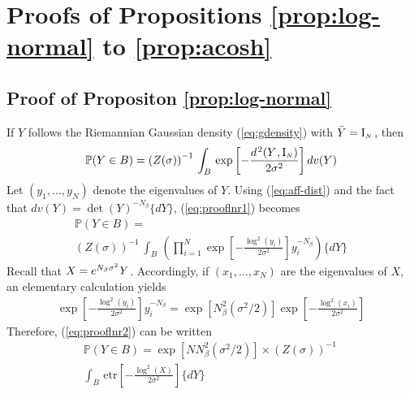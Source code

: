 \documentclass[draftclsnofoot]{IEEEtran}
\begin{document}
\appendices

\section{Proofs of Propositions \ref{prop:log-normal} to \ref{prop:acosh}} \label{app:proofs}

\subsection{Proof of Propositon \ref{prop:log-normal}}
\noindent 

If $Y$ follows the Riemannian Gaussian density (\ref{eq:gdensity}) with $\bar{Y} = \mathrm{I}_{\scriptscriptstyle N}\hspace{0.03cm}$, then 
\begin{equation} \label{eq:prooflnr1}
\mathbb{P}(Y \in B) = \left(Z(\sigma)\right)^{-1}\,\int_B\,
\exp\left[-\frac{d^{\hspace{0.03cm} 2}(Y\hspace{0.02cm},\mathrm{I}_{\scriptscriptstyle N})}{2\sigma^2}\right]dv(Y)
\end{equation}
Let $(y_{\scriptscriptstyle 1},\ldots,y_{\scriptscriptstyle N})$ denote the eigenvalues of $Y$. Using (\ref{eq:aff-dist}) and the fact that $dv(Y) = \det(Y)^{-N_\beta}\lbrace dY\rbrace$, (\ref{eq:prooflnr1}) becomes
\begin{align}\label{eq:prooflnr2}
\nonumber \mathbb{P}(Y \in B) = \\ \left(Z(\sigma)\right)^{-1}\,\int_B\,\left(
\prod^N_{i=1}\exp\left[-\frac{\log^2(y_i)}
{2\sigma^2}\right]y^{-N_\beta}_i\right)\lbrace dY\rbrace
\end{align}
Recall that $X = e^{N_\beta\sigma^2}\hspace{0.02cm}Y$. Accordingly,
if $(x_{\scriptscriptstyle 1},\ldots,x_{\scriptscriptstyle N})$ are the eigenvalues of $X$, an elementary calculation yields
$$
\begin{array}{r}
\exp\!\left[-\frac{\log^2(y_i)}
{2\sigma^2}\right]y^{-N_\beta}_i \!=\! \exp[N^2_\beta(\sigma^2/2)]
\exp\!\left[-\frac{\log^2(x_i)}
{2\sigma^2}\right]
\end{array}
$$
Therefore, (\ref{eq:prooflnr2}) can be written
\begin{align}\label{eq:prooflnr3}
\nonumber \mathbb{P}(Y \in B) = \exp[NN^2_\beta(\sigma^2/2)]\times\left(Z(\sigma)\right)^{-1}\,\\ \int_B\,\mathrm{etr}\left[-\frac{\log^2(X)}{2\sigma^2}\right] \lbrace dY\rbrace
\end{align}
\end{document}
